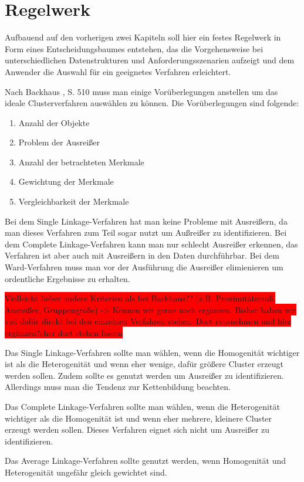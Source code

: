 \chapter{Regelwerk}

Aufbauend auf den vorherigen zwei Kapiteln soll hier ein festes Regelwerk in Form eines Entscheidungsbaumes entstehen, das die Vorgehensweise bei unterschiedlichen Datenstrukturen und Anforderungsszenarien aufzeigt und dem Anwender die Auswahl für ein geeignetes Verfahren erleichtert.

Nach Backhaus \cite{Backhaus.2016}, S. 510 muss man einige Vorüberlegungen anstellen um das ideale Clusterverfahren auswählen zu können. Die Vorüberlegungen sind folgende:
\begin{enumerate}
    \item Anzahl der Objekte
    \item Problem der Ausreißer
    \item Anzahl der betrachteten Merkmale
    \item Gewichtung der Merkmale
    \item Vergleichbarkeit der Merkmale
\end{enumerate}



Bei dem Single Linkage-Verfahren hat man keine Probleme mit Ausreißern, da man dieses Verfahren zum Teil sogar nutzt um Außreißer zu identifizieren. Bei dem Complete Linkage-Verfahren kann man nur schlecht Ausreißer erkennen, das Verfahren ist aber auch mit Ausreißern in den Daten durchführbar. Bei dem Ward-Verfahren muss man vor der Ausführung die Ausreißer elimienieren um ordentliche Ergebnisse zu erhalten.

\colorbox{red}{Vielleicht lieber andere Kriterien als bei Backhaus?? (z.B. Proximitätsmaß, Ausreißer, Gruppengröße) -> Können wir gerne noch ergänzen. Bisher haben wir viel dafür direkt bei den einzelnen Verfahren stehen. Dort rausnehmen und hier ergänzen?eher dort stehen lassen}

Das Single Linkage-Verfahren sollte man wählen, wenn die Homogenität wichtiger ist als die Heterogenität und wenn eher wenige, dafür größere Cluster erzeugt werden sollen. Zudem sollte es genutzt werden um Ausreißer zu identifizieren. Allerdings muss man die Tendenz zur Kettenbildung beachten.

Das Complete Linkage-Verfahren sollte man wählen, wenn die Heterogenität wichtiger als die Homogenität ist und wenn eher mehrere, kleinere Cluster erzeugt werden sollen. Dieses Verfahren eignet sich nicht um Ausreißer zu identifizieren.

Das Average Linkage-Verfahren sollte genutzt werden, wenn Homogenität und Heterogenität ungefähr gleich gewichtet sind.
